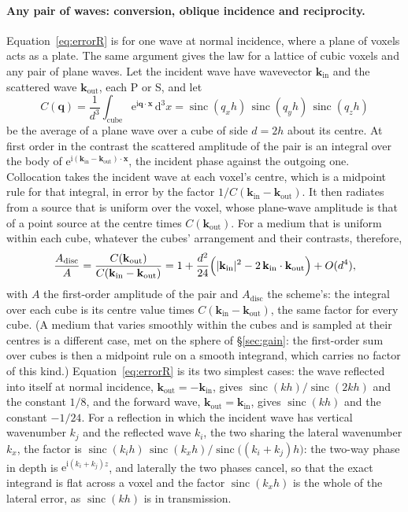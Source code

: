 \documentclass[11pt,a4paper]{article}
\newcommand{\sinc}{\operatorname{sinc}}
\newcommand{\dd}{\mathrm{d}}
\begin{document}
\paragraph{Any pair of waves: conversion, oblique incidence and reciprocity.}
Equation~\eqref{eq:errorR} is for one wave at normal incidence, where a plane of voxels acts as a plate.
The same argument gives the law for a lattice of cubic voxels and any pair of plane waves. Let the
incident wave have wavevector $\mathbf{k}_{\text{in}}$ and the scattered wave $\mathbf{k}_{\text{out}}$,
each P or S, and let
\begin{equation}\label{eq:cubeaverage}
  C(\mathbf{q})=\frac{1}{d^3}\int_{\text{cube}}\mathrm{e}^{\mathrm{i}\mathbf{q}\cdot\mathbf{x}}\,\dd^3x
  =\sinc(q_xh)\,\sinc(q_yh)\,\sinc(q_zh)
\end{equation}
be the average of a plane wave over a cube of side $d=2h$ about its centre. At first order in the
contrast the scattered amplitude of the pair is an integral over the body of
$\mathrm{e}^{\mathrm{i}(\mathbf{k}_{\text{in}}-\mathbf{k}_{\text{out}})\cdot\mathbf{x}}$, the incident
phase against the outgoing one. Collocation takes the incident wave at each voxel's centre, which is a
midpoint rule for that integral, in error by the factor $1/C(\mathbf{k}_{\text{in}}-\mathbf{k}_{\text{out}})$.
It then radiates from a source that is uniform over the voxel, whose plane-wave amplitude is that of a
point source at the centre times $C(\mathbf{k}_{\text{out}})$. For a medium that is uniform within each
cube, whatever the cubes' arrangement and their contrasts, therefore,
\begin{equation}\label{eq:pairlaw}
  \frac{A_{\text{disc}}}{A}
  =\frac{C(\mathbf{k}_{\text{out}})}{C(\mathbf{k}_{\text{in}}-\mathbf{k}_{\text{out}})}
  =1+\frac{d^2}{24}\Bigl(\lvert\mathbf{k}_{\text{in}}\rvert^2-2\,\mathbf{k}_{\text{in}}\cdot\mathbf{k}_{\text{out}}\Bigr)+O(d^4),
\end{equation}
with $A$ the first-order amplitude of the pair and $A_{\text{disc}}$ the scheme's: the integral over each
cube is its centre value times $C(\mathbf{k}_{\text{in}}-\mathbf{k}_{\text{out}})$, the same factor for every
cube. (A medium that varies smoothly within the cubes and is sampled at their centres is a different
case, met on the sphere of \S\ref{sec:gain}: the first-order sum over cubes is then a midpoint rule on a
smooth integrand, which carries no factor of this kind.) Equation~\eqref{eq:errorR}
is its two simplest cases: the wave reflected into itself at normal incidence,
$\mathbf{k}_{\text{out}}=-\mathbf{k}_{\text{in}}$, gives $\sinc(kh)/\sinc(2kh)$ and the constant $1/8$, and
the forward wave, $\mathbf{k}_{\text{out}}=\mathbf{k}_{\text{in}}$, gives $\sinc(kh)$ and the constant
$-1/24$. For a reflection in which the incident wave has vertical wavenumber $k_j$ and the reflected wave
$k_i$, the two sharing the lateral wavenumber $k_x$, the factor is
$\sinc(k_ih)\,\sinc(k_xh)/\sinc\bigl((k_i+k_j)h\bigr)$: the two-way phase in depth is
$\mathrm{e}^{\mathrm{i}(k_i+k_j)z}$, and laterally the two phases cancel, so that the exact integrand is
flat across a voxel and the factor $\sinc(k_xh)$ is the whole of the lateral error, as $\sinc(kh)$ is in
transmission.
\end{document}
